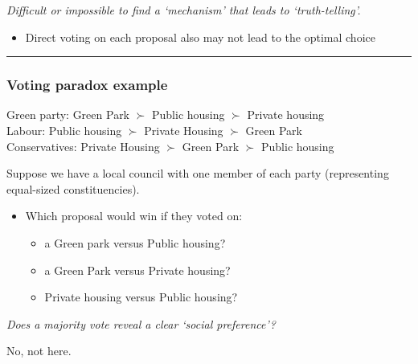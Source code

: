 \documentclass[]{article}
\providecommand{\tightlist}{%
  \setlength{\itemsep}{0pt}\setlength{\parskip}{0pt}}
\begin{document}
\bigskip

\emph{Difficult or impossible to find a `mechanism' that leads to `truth-telling'.}

\begin{itemize}
\tightlist
\item
  Direct voting on each proposal also may not lead to the optimal choice
\end{itemize}

\begin{center}\rule{0.5\linewidth}{\linethickness}\end{center}

\hypertarget{voting-paradox-example}{%
\subsubsection{Voting paradox example}\label{voting-paradox-example}}

Green party: Green Park \(\succ\) Public housing \(\succ\) Private housing\\

Labour: Public housing \(\succ\) Private Housing \(\succ\) Green Park\\

Conservatives: Private Housing \(\succ\) Green Park \(\succ\) Public housing\\

\bigskip

Suppose we have a local council with one member of each party (representing equal-sized constituencies).

\bigskip

\begin{itemize}
\tightlist
\item
  Which proposal would win if they voted on:

  \begin{itemize}
  \tightlist
  \item
    a Green park versus Public housing?
  \item
    a Green Park versus Private housing?
  \item
    Private housing versus Public housing?
  \end{itemize}
\end{itemize}

\bigskip

\emph{Does a majority vote reveal a clear `social preference'?}

\bigskip

No, not here.
\end{document}
